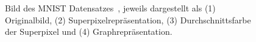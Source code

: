 \begin{figure}[t]
\centering
{}
  \caption[\gls{MNIST}]{Bild des \gls{MNIST} Datensatzes~\cite{mnist}, jeweils dargestellt als (1) Originalbild, (2) Superpixelrepräsentation, (3) Durchschnittsfarbe der Superpixel und (4) Graphrepräsentation.}
\label{fig:mnist}
\end{figure}
